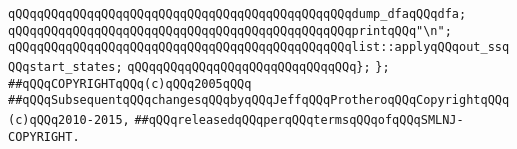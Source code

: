 \verb|qQQqqQQqqQQqqQQqqQQqqQQqqQQqqQQqqQQqqQQqqQQqqQQqdump_dfaqQQqdfa;|\newline
\verb|qQQqqQQqqQQqqQQqqQQqqQQqqQQqqQQqqQQqqQQqqQQqqQQqprintqQQq"\n";|\newline
\verb|qQQqqQQqqQQqqQQqqQQqqQQqqQQqqQQqqQQqqQQqqQQqqQQqlist::applyqQQqout_ssqQQqstart_states;|\newline
\verb|qQQqqQQqqQQqqQQqqQQqqQQqqQQqqQQq};|\newline
\verb|};|\newline
\newline
\newline
\verb|##qQQqCOPYRIGHTqQQq(c)qQQq2005qQQq|\newline
\verb|##qQQqSubsequentqQQqchangesqQQqbyqQQqJeffqQQqProtheroqQQqCopyrightqQQq(c)qQQq2010-2015,|\newline
\verb|##qQQqreleasedqQQqperqQQqtermsqQQqofqQQqSMLNJ-COPYRIGHT.|\newline

